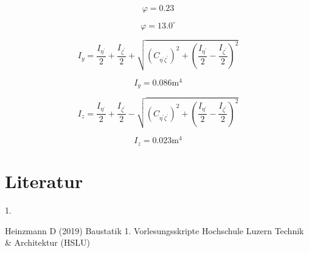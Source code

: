 \documentclass[
  12pt,
  letterpaper,
  DIV=11,
  egregdoesnotlikesansseriftitles]{scrartcl}
\newlength{\cslhangindent}
\newlength{\csllabelwidth}
\newlength{\cslentryspacingunit} %
\newenvironment{CSLReferences}[2] %
 {%
  \setlength{\parindent}{0pt}
  \ifodd #1
  \let\oldpar\par
  \def\par{\hangindent=\cslhangindent\oldpar}
  \fi
  \setlength{\parskip}{#2\cslentryspacingunit}
 }%
 {}
\newcommand{\CSLLeftMargin}[1]{\parbox[t]{\csllabelwidth}{#1}}
\newcommand{\CSLRightInline}[1]{\parbox[t]{\linewidth - \csllabelwidth}{#1}\break}
\begin{document}
\begin{equation}\varphi = 0.23\end{equation}

\begin{equation}\varphi = 13.0 ^\circ\end{equation}

\begin{equation}I_{y} = \frac{I_{\eta^{'}}}{2} + \frac{I_{\zeta^{'}}}{2} + \sqrt{\left(C_{\eta^{'}\zeta^{'}}\right)^{2} + \left(\frac{I_{\eta^{'}}}{2} - \frac{I_{\zeta^{'}}}{2}\right)^{2}}\end{equation}

\begin{equation}I_{y} = 0.086 \text{m}^{4}\end{equation}

\begin{equation}I_{z} = \frac{I_{\eta^{'}}}{2} + \frac{I_{\zeta^{'}}}{2} - \sqrt{\left(C_{\eta^{'}\zeta^{'}}\right)^{2} + \left(\frac{I_{\eta^{'}}}{2} - \frac{I_{\zeta^{'}}}{2}\right)^{2}}\end{equation}

\begin{equation}I_{z} = 0.023 \text{m}^{4}\end{equation}

\hypertarget{literatur}{%
\section*{Literatur}\label{literatur}}

\hypertarget{refs}{}
\begin{CSLReferences}{0}{0}
\leavevmode{}%
\CSLLeftMargin{1. }%
\CSLRightInline{Heinzmann D (2019) Baustatik 1. Vorlesungsskripte
Hochschule Luzern Technik \& Architektur (HSLU)}

\end{CSLReferences}
\end{document}
